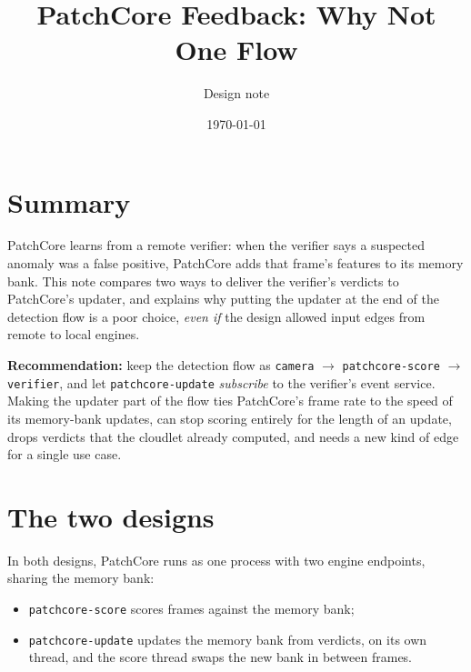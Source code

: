 \documentclass[11pt]{article}
\title{PatchCore Feedback: Why Not One Flow}
\author{Design note}
\date{\today}
\newcommand{\code}[1]{\texttt{#1}}
\begin{document}
\maketitle

\section{Summary}

PatchCore learns from a remote verifier: when the verifier says a suspected
anomaly was a false positive, PatchCore adds that frame's features to its
memory bank. This note compares two ways to deliver the verifier's verdicts to
PatchCore's updater, and explains why putting the updater at the end of the
detection flow is a poor choice, \emph{even if} the design allowed input edges
from remote to local engines.

\textbf{Recommendation:} keep the detection flow as
\code{camera} $\to$ \code{patchcore-score} $\to$ \code{verifier}, and let
\code{patchcore-update} \emph{subscribe} to the verifier's event service. Making
the updater part of the flow ties PatchCore's frame rate to the speed of its
memory-bank updates, can stop scoring entirely for the length of an update,
drops verdicts that the cloudlet already computed, and needs a new kind of
edge for a single use case.

\section{The two designs}

In both designs, PatchCore runs as one process with two engine endpoints,
sharing the memory bank:
\begin{itemize}[nosep]
  \item \code{patchcore-score} scores frames against the memory bank;
  \item \code{patchcore-update} updates the memory bank from verdicts, on its
        own thread, and the score thread swaps the new bank in between frames.
\end{itemize}
\end{document}
